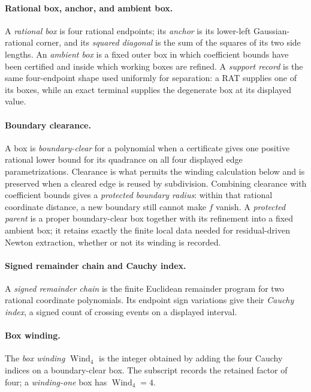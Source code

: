 \documentclass[11pt]{article}
\newcommand{\Wind}{\operatorname{Wind}}
\begin{document}
\paragraph{Rational box, anchor, and ambient box.}
A \emph{rational box} is four rational endpoints; its \emph{anchor} is its
lower-left Gaussian-rational corner, and its \emph{squared diagonal} is the
sum of the squares of its two side lengths.  An \emph{ambient box} is a fixed
outer box in which coefficient bounds have been certified and inside which
working boxes are refined.  A \emph{support record} is the same four-endpoint
shape used uniformly for separation: a RAT supplies one of its boxes, while
an exact terminal supplies the degenerate box at its displayed value.

\paragraph{Boundary clearance.}
A box is \emph{boundary-clear} for a polynomial when a certificate gives one
positive rational lower bound for its quadrance on all four displayed edge
parametrizations.  Clearance is what permits the winding calculation below
and is preserved when a cleared edge is reused by subdivision.  Combining
clearance with coefficient bounds gives a \emph{protected boundary radius}:
within that rational coordinate distance, a new boundary still cannot make
$f$ vanish.  A \emph{protected parent} is a proper boundary-clear box together
with its refinement into a fixed ambient box; it retains exactly the finite
local data needed for residual-driven Newton extraction, whether or not its
winding is recorded.

\paragraph{Signed remainder chain and Cauchy index.}
A \emph{signed remainder chain} is the finite Euclidean remainder program
for two rational coordinate polynomials.  Its endpoint sign variations give
their \emph{Cauchy index}, a signed count of crossing events on a displayed
interval.

\paragraph{Box winding.}
The \emph{box winding} $\Wind_4$ is the integer obtained by adding the four
Cauchy indices on a boundary-clear box.  The subscript records the retained
factor of four; a \emph{winding-one} box has $\Wind_4=4$.
\end{document}
